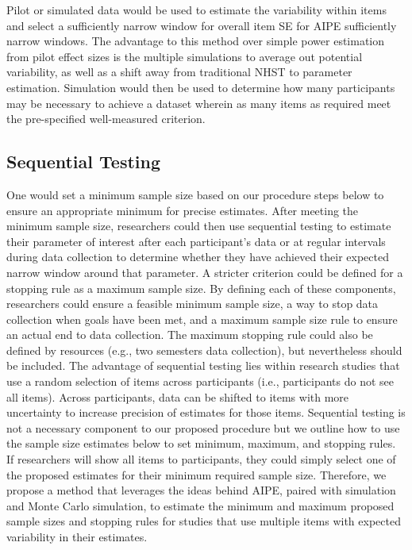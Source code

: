 \documentclass[
  man]{apa7}
\begin{document}
Pilot or simulated data would be used to estimate the variability within items and select a sufficiently narrow window for overall item SE for AIPE sufficiently narrow windows. The advantage to this method over simple power estimation from pilot effect sizes is the multiple simulations to average out potential variability, as well as a shift away from traditional NHST to parameter estimation. Simulation would then be used to determine how many participants may be necessary to achieve a dataset wherein as many items as required meet the pre-specified well-measured criterion.

\subsection{Sequential Testing}\label{sequential-testing}

One would set a minimum sample size based on our procedure steps below to ensure an appropriate minimum for precise estimates. After meeting the minimum sample size, researchers could then use sequential testing to estimate their parameter of interest after each participant's data or at regular intervals during data collection to determine whether they have achieved their expected narrow window around that parameter. A stricter criterion could be defined for a stopping rule as a maximum sample size. By defining each of these components, researchers could ensure a feasible minimum sample size, a way to stop data collection when goals have been met, and a maximum sample size rule to ensure an actual end to data collection. The maximum stopping rule could also be defined by resources (e.g., two semesters data collection), but nevertheless should be included. The advantage of sequential testing lies within research studies that use a random selection of items across participants (i.e., participants do not see all items). Across participants, data can be shifted to items with more uncertainty to increase precision of estimates for those items. Sequential testing is not a necessary component to our proposed procedure but we outline how to use the sample size estimates below to set minimum, maximum, and stopping rules. If researchers will show all items to participants, they could simply select one of the proposed estimates for their minimum required sample size. Therefore, we propose a method that leverages the ideas behind AIPE, paired with simulation and Monte Carlo simulation, to estimate the minimum and maximum proposed sample sizes and stopping rules for studies that use multiple items with expected variability in their estimates.
\end{document}
